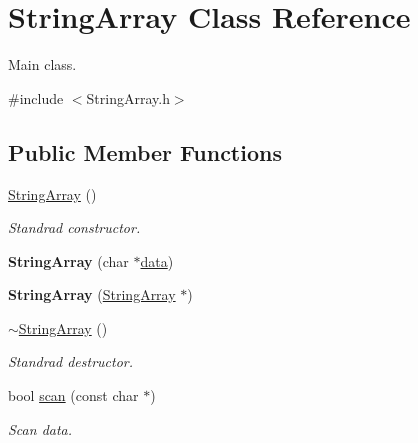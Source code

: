 \hypertarget{class_string_array}{}\section{String\+Array Class Reference}
\label{class_string_array}


Main class.  




{\ttfamily \#include $<$String\+Array.\+h$>$}

\subsection*{Public Member Functions}
\begin{DoxyCompactItemize}
\item 
\mbox{\label{class_string_array_a02f4a1dc1bc63b44c4aeafe174b3b681}} 
\mbox{\hyperlink{class_string_array_a02f4a1dc1bc63b44c4aeafe174b3b681}{String\+Array}} ()
\begin{DoxyCompactList}\small\item\em Standrad constructor. \end{DoxyCompactList}\item 
\mbox{\label{class_string_array_a7bf94fc2111c9c27c7c7c22e98ffbb5c}} 
{\bfseries String\+Array} (char $\ast$\mbox{\hyperlink{class_string_array_a1b86e87f389149e5143a2d6e4cc5a464}{data}})
\item 
\mbox{\label{class_string_array_ae3d61d4f09029a9b803bf61fd3853929}} 
{\bfseries String\+Array} (\mbox{\hyperlink{class_string_array}{String\+Array}} $\ast$)
\item 
\mbox{\label{class_string_array_af1fc945005ae8a218d30c3281e0b64bd}} 
\mbox{\hyperlink{class_string_array_af1fc945005ae8a218d30c3281e0b64bd}{$\sim$\+String\+Array}} ()
\begin{DoxyCompactList}\small\item\em Standrad destructor. \end{DoxyCompactList}\item 
bool \mbox{\hyperlink{class_string_array_af548aec5f0efc6bdcb85bbc9ff3314ae}{scan}} (const char $\ast$)
\begin{DoxyCompactList}\small\item\em Scan data. \end{DoxyCompactList}\item 

\end{DoxyCompactItemize}
